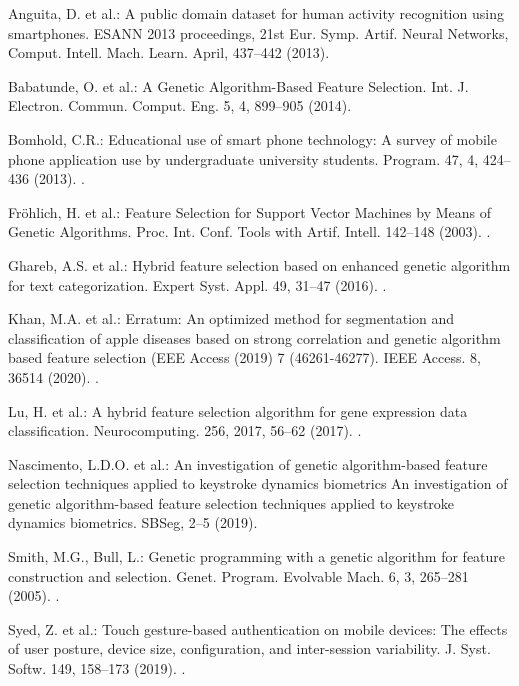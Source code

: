 \documentclass[runningheads]{llncs}
\begin{document}
\begin{thebibliography}{8}

Anguita, D. et al.: A public domain dataset for human activity recognition using smartphones. ESANN 2013 proceedings, 21st Eur. Symp. Artif. Neural Networks, Comput. Intell. Mach. Learn. April, 437–442 (2013).

Babatunde, O. et al.: A Genetic Algorithm-Based Feature Selection. Int. J. Electron. Commun. Comput. Eng. 5, 4, 899–905 (2014).

Bomhold, C.R.: Educational use of smart phone technology: A survey of mobile phone application use by undergraduate university students. Program. 47, 4, 424–436 (2013). .

Fröhlich, H. et al.: Feature Selection for Support Vector Machines by Means of Genetic Algorithms. Proc. Int. Conf. Tools with Artif. Intell. 142–148 (2003). .

Ghareb, A.S. et al.: Hybrid feature selection based on enhanced genetic algorithm for text categorization. Expert Syst. Appl. 49, 31–47 (2016). .

Khan, M.A. et al.: Erratum: An optimized method for segmentation and classification of apple diseases based on strong correlation and genetic algorithm based feature selection (EEE Access (2019) 7 (46261-46277). IEEE Access. 8, 36514 (2020). .

Lu, H. et al.: A hybrid feature selection algorithm for gene expression data classification. Neurocomputing. 256, 2017, 56–62 (2017). .

Nascimento, L.D.O. et al.: An investigation of genetic algorithm-based feature selection techniques applied to keystroke dynamics biometrics An investigation of genetic algorithm-based feature selection techniques applied to keystroke dynamics biometrics. SBSeg, 2–5 (2019).

Smith, M.G., Bull, L.: Genetic programming with a genetic algorithm for feature construction and selection. Genet. Program. Evolvable Mach. 6, 3, 265–281 (2005). .

Syed, Z. et al.: Touch gesture-based authentication on mobile devices: The effects of user posture, device size, configuration, and inter-session variability. J. Syst. Softw. 149, 158–173 (2019). .


\end{thebibliography}
\end{document}
